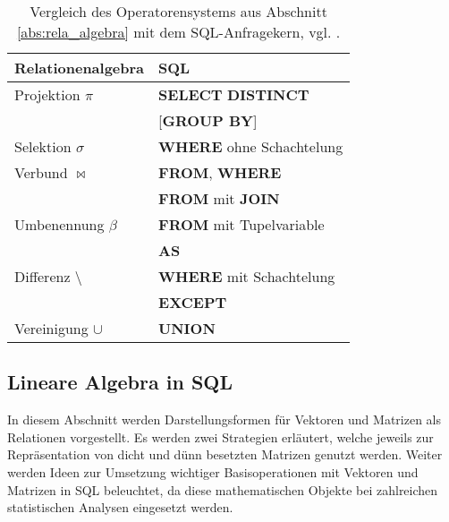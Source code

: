 \begin{table}[h]
    \centering
    \begin{tabular}{|l|l|} \hline
        Relationenalgebra &SQL \\ 
        \hline
        Projektion $\pi$ &\textbf{SELECT} \textbf{DISTINCT} \\ 
        &[\textbf{GROUP BY}] \\
        \hline
        Selektion $\sigma$ &\textbf{WHERE} ohne Schachtelung\\
        \hline
        Verbund $\bowtie$ &\textbf{FROM}, \textbf{WHERE}\\
        &\textbf{FROM} mit \textbf{JOIN} \\
        \hline
        Umbenennung $\beta$ &\textbf{FROM} mit Tupelvariable \\ &\textbf{AS} \\
        \hline
        Differenz $\setminus$ & \textbf{WHERE} mit Schachtelung \\
                  & \textbf{EXCEPT} \\
        \hline
        Vereinigung $\cup$ &\textbf{UNION}  \\
        \hline        
    \end{tabular}
    \caption[Vergleich der Operatoren mit dem SQL-Kern]{Vergleich des Operatorensystems aus Abschnitt \ref{abs:rela_algebra} mit dem SQL-Anfragekern, vgl. \cite{DBLP:books/daglib/0044627}.}
    \label{table:vgl}
\end{table}
\subsection{Lineare Algebra in SQL}
\label{abs:SQL_linalg}
In diesem Abschnitt werden Darstellungsformen für Vektoren und Matrizen als Relationen vorgestellt. Es werden zwei Strategien erläutert, welche jeweils zur Repräsentation von dicht und dünn besetzten Matrizen genutzt werden. Weiter werden Ideen zur Umsetzung wichtiger Basisoperationen mit Vektoren und Matrizen in SQL beleuchtet, da diese mathematischen Objekte bei zahlreichen statistischen Analysen eingesetzt werden.
